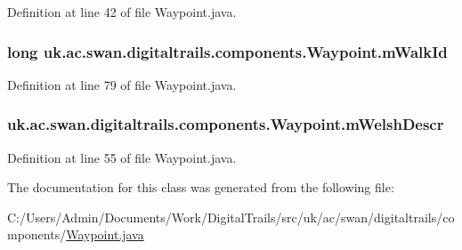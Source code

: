 Definition at line 42 of file Waypoint.\+java.

\hypertarget{classuk_1_1ac_1_1swan_1_1digitaltrails_1_1components_1_1_waypoint_a94192130dff765b69fa6cd31e3fd3357}{
\subsubsection[{m\+Walk\+Id}]{\setlength{\rightskip}{0pt plus 5cm}long uk.\+ac.\+swan.\+digitaltrails.\+components.\+Waypoint.\+m\+Walk\+Id\hspace{0.3cm}{\ttfamily [private]}}}\label{classuk_1_1ac_1_1swan_1_1digitaltrails_1_1components_1_1_waypoint_a94192130dff765b69fa6cd31e3fd3357}


Definition at line 79 of file Waypoint.\+java.

\hypertarget{classuk_1_1ac_1_1swan_1_1digitaltrails_1_1components_1_1_waypoint_a2f719ce0aad16f15f872cd786647eaca}{
\subsubsection[{m\+Welsh\+Descr}]{ uk.\+ac.\+swan.\+digitaltrails.\+components.\+Waypoint.\+m\+Welsh\+Descr\hspace{0.3cm}{\ttfamily [private]}}}\label{classuk_1_1ac_1_1swan_1_1digitaltrails_1_1components_1_1_waypoint_a2f719ce0aad16f15f872cd786647eaca}


Definition at line 55 of file Waypoint.\+java.



The documentation for this class was generated from the following file\+:\begin{DoxyCompactItemize}
\item 
C\+:/\+Users/\+Admin/\+Documents/\+Work/\+Digital\+Trails/src/uk/ac/swan/digitaltrails/components/\hyperlink{_waypoint_8java}{Waypoint.\+java}\end{DoxyCompactItemize}
